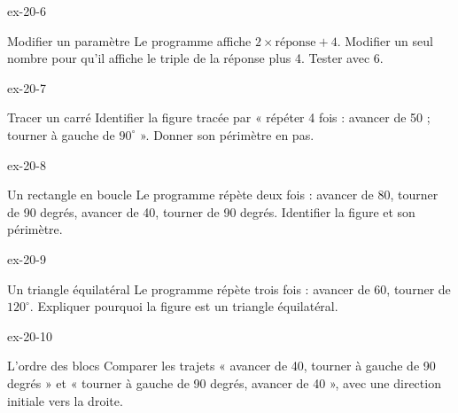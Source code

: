 \begin{blocLivre}{ex-20-6}\begin{exercice}[2]{Modifier un paramètre}
Le programme affiche $2\times\text{réponse}+4$. Modifier un seul nombre pour qu’il affiche le triple de la réponse plus 4. Tester avec 6.
\label{fig-ex-20-6}
\end{exercice}\end{blocLivre}
\begin{blocLivre}{ex-20-7}\begin{exercice}[2]{Tracer un carré}
Identifier la figure tracée par « répéter 4 fois : avancer de 50 ; tourner à gauche de $90^\circ$ ». Donner son périmètre en pas.
\label{fig-ex-20-7}
\end{exercice}\end{blocLivre}
\begin{blocLivre}{ex-20-8}\begin{exercice}[2]{Un rectangle en boucle}
Le programme répète deux fois : avancer de 80, tourner de 90 degrés, avancer de 40, tourner de 90 degrés. Identifier la figure et son périmètre.
\label{fig-ex-20-8}
\end{exercice}\end{blocLivre}
\begin{blocLivre}{ex-20-9}\begin{exercice}[2]{Un triangle équilatéral}
Le programme répète trois fois : avancer de 60, tourner de $120^\circ$. Expliquer pourquoi la figure est un triangle équilatéral.
\label{fig-ex-20-9}
\end{exercice}\end{blocLivre}
\begin{blocLivre}{ex-20-10}\begin{exercice}[2]{L’ordre des blocs}
Comparer les trajets « avancer de 40, tourner à gauche de 90 degrés » et « tourner à gauche de 90 degrés, avancer de 40 », avec une direction initiale vers la droite.
\label{fig-ex-20-10}
\end{exercice}\end{blocLivre}

